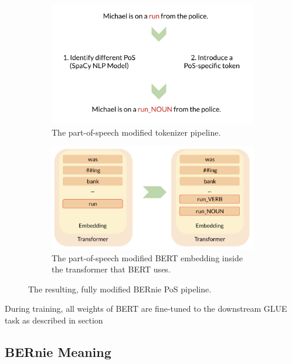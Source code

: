 \documentclass[a4paper,12pt,twoside,openright]{report}
\begin{document}
\begin{figure}[H]
\begin{subfigure}{.5\textwidth}
  \centering
  \includegraphics[width=\linewidth]{./assets/experiments/pipeline_tokenizer_BERnie_POS_sentence.png}
  \caption{The part-of-speech modified tokenizer pipeline.}
  \label{fig:sfig1}
\end{subfigure}%
\hfill
\begin{subfigure}{.65\textwidth}
  \centering
  \includegraphics[width=\linewidth]{./assets/experiments/pipeline_model_BERnie_POS.png}
  \caption{The part-of-speech modified BERT embedding inside the transformer that BERT uses.}
  \label{fig:sfig2}
\end{subfigure}
\caption{The resulting, fully modified BERnie PoS pipeline.}
\label{fig:fig}
\end{figure}

During training, all weights of BERT are fine-tuned to the downstream GLUE task as described in section 

\subsection{BERnie Meaning}\label{experiment_bernie_meaning}
\end{document}
